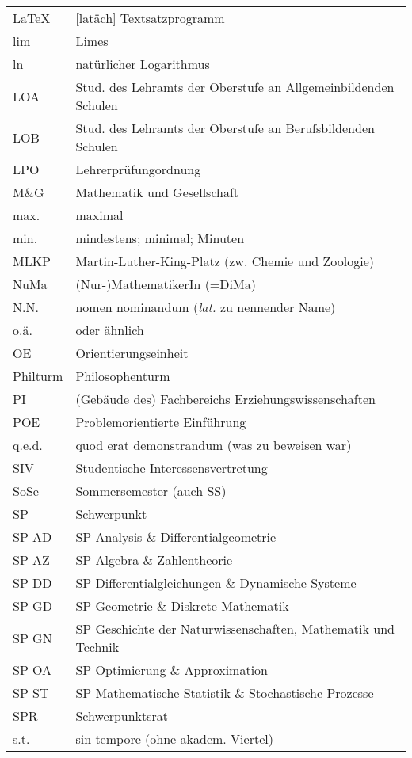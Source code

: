 \begin{tabular}{|p{10mm} p{68mm}|}
\hline
\LaTeX 	& [latäch] Textsatzprogramm \\
lim     & Limes \\
ln      & natürlicher Logarithmus \\
LOA    	& Stud. des Lehramts der Oberstufe an Allgemeinbildenden Schulen \\
LOB    	& Stud. des Lehramts der Oberstufe an Berufsbildenden Schulen \\
LPO    	& Lehrerprüfungordnung \\
M\&G    & Mathematik und Gesellschaft \\
max.    & maximal \\
min.    & mindestens; minimal; Minuten \\
MLKP   	& Martin-Luther-King-Platz (zw. Chemie und Zoologie) \\
NuMa    & (Nur-)MathematikerIn (=DiMa) \\
N.N.		& nomen nominandum (\textit{lat.} zu nennender Name) \\
o.ä.  	& oder ähnlich \\
OE     	& Orientierungseinheit \\
Philturm & Philosophenturm \\
PI     	& (Gebäude des) Fachbereichs Erzieh\-ungs\-wissenschaften \\
POE    	& Problemorientierte Einführung \\
q.e.d. 	& quod erat demonstrandum (was zu beweisen war) \\
SIV    	& Studentische Interessensvertretung \\
SoSe   	& Sommersemester (auch SS) \\
SP     	& Schwerpunkt \\
SP AD  	& SP Analysis \& Differentialgeometrie \\
SP AZ  	& SP Algebra \& Zahlentheorie \\
SP DD  	& SP Differentialgleichungen \& Dynamische Systeme \\
SP GD  	& SP Geometrie \& Diskrete Mathematik \\
SP GN  	& SP Geschichte der Naturwissenschaften, Mathematik und Technik \\
SP OA  	& SP Optimierung \& Approximation \\
SP ST  	& SP Mathematische Statistik \& Stochastische Prozesse \\
SPR   	& Schwerpunktsrat\\
s.t.		& sin tempore (ohne akadem. Viertel) \\

\end{tabular}

